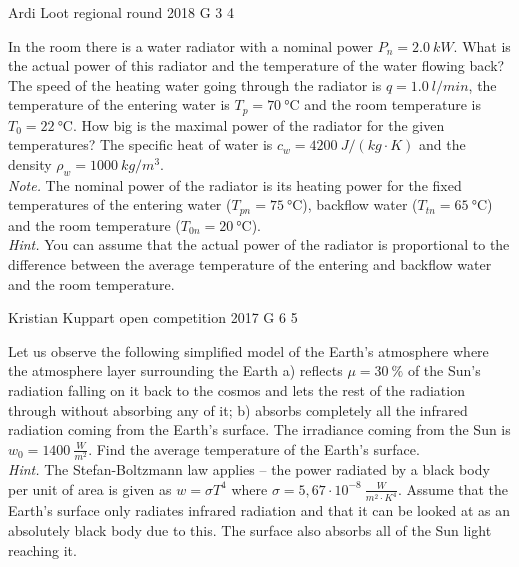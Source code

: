 \documentclass[11pt]{article}
\begin{document}
{Ardi Loot} %
{regional round} %
{2018} %
{G 3} %
{4} %
{

\ifEngStatement
In the room there is a water radiator with a nominal power $P_{n}=\SI{2.0}{kW}$. What is the actual power of this radiator and the temperature of the water flowing back? The speed of the heating water going through the radiator is $q=\SI{1.0}{l/min}$, the temperature of the entering water is $T_{p}=\SI{70}{\celsius}$ and the room temperature is $T_{0}=\SI{22}{\celsius}$.  How big is the maximal power of the radiator for the given temperatures? The specific heat of water is $c_{w}=\SI{4200}{J/\left(kg\cdot K\right)}$ and the density $\rho_{w}=\SI{1000}{kg/m^{3}}$.\\ 
\emph{Note.} The nominal power of the radiator is its heating power for the fixed temperatures of the entering water ($T_{pn}=\SI{75}{\celsius}$), backflow water ($T_{tn}=\SI{65}{\celsius}$) and the room temperature ($T_{0n}=\SI{20}{\celsius}$).\\
\emph{Hint.} You can assume that the actual power of the radiator is proportional to the difference between the average temperature of the entering and backflow water and the room temperature.
\fi
}

{Kristian Kuppart} %
{open competition} %
{2017} %
{G 6} %
{5} %
{

\ifEngStatement
Let us observe the following simplified model of the Earth’s atmosphere where the atmosphere layer surrounding the Earth a) reflects $\mu=\SI{30}{\%}$ of the Sun’s radiation falling on it back to the cosmos and lets the rest of the radiation through without absorbing any of it; b) absorbs completely all the infrared radiation coming from the Earth’s surface. The irradiance coming from the Sun is $w_0=\SI{1400}{\frac{W}{m^2}}$. Find the average temperature of the Earth’s surface.\\
\emph{Hint.} The Stefan-Boltzmann law applies – the power radiated by a black body per unit of area is given as $w=\sigma T^4$ where $\sigma =5,67 \cdot 10^{-8} \SI{}{\frac{W}{m^2 \cdot K^4}}$. Assume that the Earth’s surface only radiates infrared radiation and that it can be looked at as an absolutely black body due to this. The surface also absorbs all of the Sun light reaching it.
\fi
}
\end{document}
